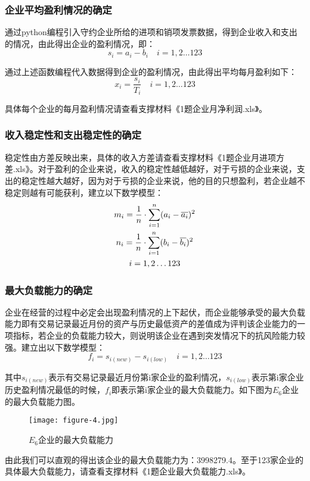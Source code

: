 \documentclass[dvipsnames,withoutpreface,bwprint]{cumcmthesis}
\begin{document}
\subsubsection{企业平均盈利情况的确定}
通过python编程引入守约企业所给的进项和销项发票数据，得到企业收入和支出的情况，由此得出企业的盈利情况，即：
\begin{equation}
    s_i=a_i-b_i \quad i=1,2\dots123
\end{equation}
\par 通过上述函数编程代入数据得到企业的盈利情况，由此得出平均每月盈利如下：
\begin{equation}
     x_i=\frac{s_i}{T_i} \quad i=1,2\dots123
\end{equation}
\par 具体每个企业的每月盈利情况请查看支撑材料《1题企业月净利润.xls》。
\subsubsection{收入稳定性和支出稳定性的确定}
稳定性由方差反映出来，具体的收入方差请查看支撑材料《1题企业月进项方差.xls》。对于盈利的企业来说，收入的稳定性越低越好，对于亏损的企业来说，支出的稳定性越大越好，因为对于亏损的企业来说，他的目的只想盈利，若企业越不稳定则越有可能获利，建立以下数学模型：
\begin{gather}
    m_i=\frac{1}{n} \cdot \sum\limits _{i=1}^n (a_i-\overline{a_i})^2\\
    n_i=\frac{1}{n} \cdot \sum\limits _{i=1}^n (b_i-\overline{b_i})^2\\
    i=1,2\dots123 \notag
\end{gather}
\subsubsection{最大负载能力的确定}
企业在经营的过程中必定会出现盈利情况的上下起伏，而企业能够承受的最大负载能力即有交易记录最近月份的资产与历史最低资产的差值成为评判该企业能力的一项指标，若企业的负载能力较大，则说明该企业在遇到突发情况下的抗风险能力较强。建立出以下数学模型：
\begin{equation}
    f_i=s_{i(new)}-s_{i(low)}\quad i=1,2\dots123
\end{equation}
\par 其中$s_{i(new)}$表示有交易记录最近月份第i家企业的盈利情况，$s_{i(low)}$表示第i家企业历史盈利情况最低的时候，$f_i$即表示第i家企业的最大负载能力。如下图为$E_6$企业的最大负载能力图。
\begin{figure}[H]
    \centering
    \texttt{[image: figure-4.jpg]}
    \caption{$E_6$企业的最大负载能力}
    \label{fig:2}%
\end{figure}
\par 由此我们可以直观的得出该企业的最大负载能力为：3998279.4。至于123家企业的具体最大负载能力，请查看支撑材料《1题企业最大负载能力.xls》。
\end{document}
